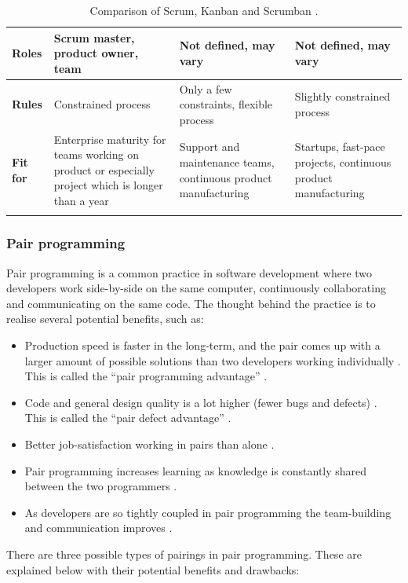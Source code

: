 \begin{center}
\begin{longtable}{| p{2.25cm} | p{2.8cm} | p{2.8cm} | p{2.8cm} |}
    \textbf{Roles} & Scrum master, product owner, team & Not defined, may vary & Not defined, may vary \\ \hline
    \textbf{Rules} & Constrained process & Only a few constraints, flexible process & Slightly constrained process \\ \hline
    \textbf{Fit for} & Enterprise maturity for teams working on product or especially project which is longer than a year & Support and maintenance teams, continuous product manufacturing & Startups, fast-pace projects, continuous product manufacturing \\ \hline 

    \caption{Comparison of Scrum, Kanban and Scrumban \cite{Scrumban2015}.}
    \label{coskas}
    \end{longtable}
\end{center}

\subsubsection{Pair programming}

Pair programming is a common practice in software development where two developers work side-by-side on the same computer, continuously collaborating and communicating on the same code. The thought behind the practice is to realise several potential benefits, such as:

\begin{itemize}
  \item Production speed is faster in the long-term, and the pair comes up with a larger amount of possible solutions than two developers working individually \cite{Cockburn2001}. This is called the ``pair programming advantage'' \cite{Padberg2003}.
  \item Code and general design quality is a lot higher (fewer bugs and defects) \cite{Cockburn2001}. This is called the ``pair defect advantage'' \cite{Padberg2003}.
  \item Better job-satisfaction working in pairs than alone \cite{Cockburn2001}.
  \item Pair programming increases learning as knowledge is constantly shared between the two programmers \cite{Cockburn2001}.
  \item As developers are so tightly coupled in pair programming the team-building and communication improves \cite{Cockburn2001}.
\end{itemize}

There are three possible types of pairings in pair programming. These are explained below with their potential benefits and drawbacks:

